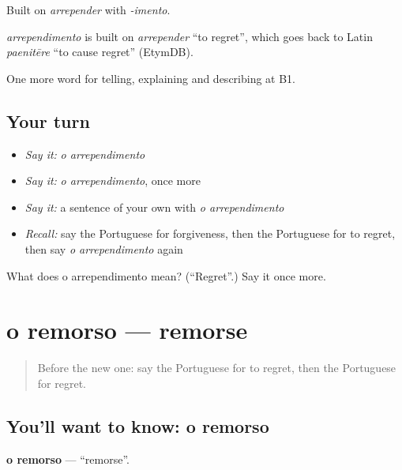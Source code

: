 Built on \emph{arrepender} with \emph{-imento}.

\begin{cousinweb}
\emph{arrependimento} is built on \emph{arrepender} \textquotedblleft{}to regret\textquotedblright{}, which goes back to Latin \emph{paenitēre} \textquotedblleft{}to cause regret\textquotedblright{} (EtymDB).
\end{cousinweb}

\begin{grammarlens}[title={What you've built}]
One more word for telling, explaining and describing at B1.
\end{grammarlens}

\subsection*{Your turn}
\begin{itemize}
\raggedright
  \item \emph{Say it:} \emph{o arrependimento}
  \item \emph{Say it:} \emph{o arrependimento}, once more
  \item \emph{Say it:} a sentence of your own with \emph{o arrependimento}
  \item \emph{Recall:} say the Portuguese for forgiveness, then the Portuguese for to regret, then say \emph{o arrependimento} again
\end{itemize}

\begin{tcolorbox}[breakable,colback=teal!4,colframe=teal!35!black,title={Before you move on}]
What does o arrependimento mean? (\textquotedblleft{}Regret\textquotedblright{}.) Say it once more.
\end{tcolorbox}
\section[o remorso]{o remorso — remorse}

\label{lesson:PT-C480-remorso}



\begin{quote}
Before the new one: say the Portuguese for to regret, then the Portuguese for regret.
\end{quote}

\subsection*{You'll want to know: o remorso}
\textbf{o remorso} — \textquotedblleft{}remorse\textquotedblright{}.

